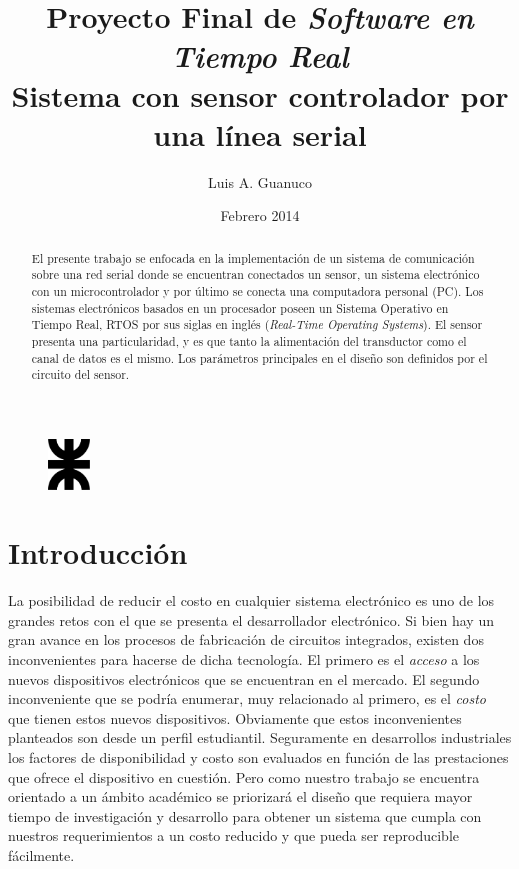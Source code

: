 \documentclass[11pt,a4paper,oneside]{article}
\title{Proyecto Final de \emph{Software en Tiempo Real} \\ \small{Sistema con sensor controlador por una línea serial}}
\author{Luis A. Guanuco}
\date{Febrero 2014}
\begin{document}
\maketitle{}


\begin{figure}[h]
  \centering
  \includegraphics[width=0.1\textwidth]{images/logoUTN}
\end{figure}


\begin{abstract}
  El presente trabajo se enfocada en la implementación de un sistema de comunicación sobre una red serial donde se encuentran conectados un sensor, un sistema electrónico con un microcontrolador y por último se conecta una computadora personal (PC). Los sistemas electrónicos basados en un procesador poseen un Sistema Operativo en Tiempo Real, RTOS por sus siglas en inglés (\textsl{Real-Time Operating Systems}). El sensor presenta una particularidad, y es que tanto la alimentación del transductor como el canal de datos es el mismo. Los parámetros principales en el diseño son definidos por el circuito del sensor.
\end{abstract}

\section{Introducción}
\label{sec:intro}

La posibilidad de reducir el costo en cualquier sistema electrónico es uno de los grandes retos con el que se presenta el desarrollador electrónico. Si bien hay un gran avance en los procesos de fabricación de circuitos integrados, existen dos inconvenientes para hacerse de dicha tecnología. El primero es el \emph{acceso} a los nuevos dispositivos electrónicos que se encuentran en el mercado. El segundo inconveniente que se podría enumerar, muy relacionado al primero, es el \emph{costo} que tienen estos nuevos dispositivos. Obviamente que estos inconvenientes planteados son desde un perfil estudiantil. Seguramente en desarrollos industriales los factores de disponibilidad y costo son evaluados en función de las prestaciones que ofrece el dispositivo en cuestión. Pero como nuestro trabajo se encuentra orientado a un ámbito académico se priorizará el diseño que requiera mayor tiempo de investigación y desarrollo para obtener un sistema que cumpla con nuestros requerimientos a un costo reducido y que pueda ser reproducible fácilmente.
\end{document}
